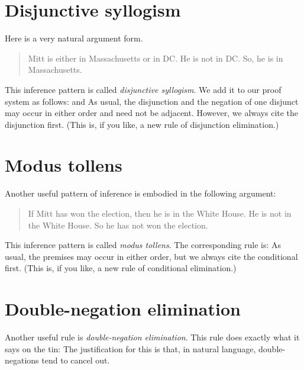 \section{Disjunctive syllogism}
Here is a very natural argument form.
	\begin{quote}
		Mitt is either in Massachusetts or in DC. He is not in DC. So, he is in Massachusetts.
	\end{quote}
This inference pattern is called \emph{disjunctive syllogism}. We add it to our proof system as follows:
and
As usual, the disjunction and the negation of one disjunct may occur in either order and need not be adjacent. However, we always cite the disjunction first. (This is, if you like, a new rule of disjunction elimination.)

\section{Modus tollens}
Another useful pattern of inference is embodied in the following argument:
	\begin{quote}
		If Mitt has won the election, then he is in the White House. He is not in the White House. So he has not won the election.
	\end{quote}
This inference pattern is called \emph{modus tollens}. The corresponding rule is:
As usual, the premises may occur in either order, but we always cite the conditional first. (This is, if you like, a new rule of conditional elimination.)

\section{Double-negation elimination}
Another useful rule is \emph{double-negation elimination}. This rule does exactly what it says on the tin:
The justification for this is that, in natural language, double-negations tend to cancel out. 

